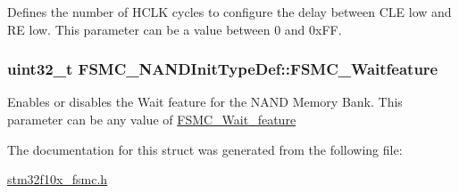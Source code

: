 \label{structFSMC__NANDInitTypeDef_a633c7be46a1d281916b9f2e34fa3d36a}
Defines the number of HCLK cycles to configure the delay between CLE low and RE low. This parameter can be a value between 0 and 0xFF. \hypertarget{structFSMC__NANDInitTypeDef_ab350e15014c4a9f4b2c2f2848f11eeca}{
\subsubsection[{FSMC\_\-Waitfeature}]{\setlength{\rightskip}{0pt plus 5cm}uint32\_\-t {\bf FSMC\_\-NANDInitTypeDef::FSMC\_\-Waitfeature}}}
\label{structFSMC__NANDInitTypeDef_ab350e15014c4a9f4b2c2f2848f11eeca}
Enables or disables the Wait feature for the NAND Memory Bank. This parameter can be any value of \hyperlink{group__FSMC__Wait__feature}{FSMC\_\-Wait\_\-feature} 

The documentation for this struct was generated from the following file:\begin{DoxyCompactItemize}
\item 
\hyperlink{stm32f10x__fsmc_8h}{stm32f10x\_\-fsmc.h}\end{DoxyCompactItemize}
